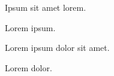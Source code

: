 \documentclass{article}
\begin{document}
\beginnumbering
\pstart
    Ipsum sit amet lorem.
\pend
\pausenumbering

\begin{pairs}  
\begin{Leftside} 
    \resumenumbering  
    \pstart  
        Lorem ipsum.
    \pend  
    \pausenumbering
\end{Leftside} 
\begin{Rightside}   
    \beginnumbering  
    \pstart  
        Lorem ipsum dolor sit amet.
    \pend  
    \pausenumbering
\end{Rightside}  
\end{pairs}  
\Columns

\resumenumbering
\pstart  
    Lorem  dolor.
\pend  
\pausenumbering
\end{document}

